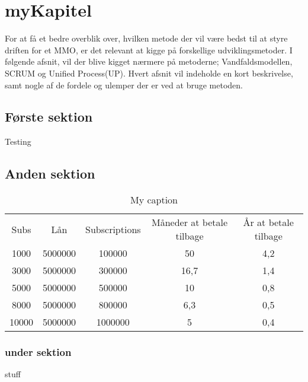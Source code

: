 \cfoot{\page\textbackslash \totalp} %
\chapter{myKapitel}
For at få et bedre overblik over, hvilken metode der vil være bedst til at styre driften for et MMO, er det relevant at kigge på forskellige udviklingsmetoder. I følgende afsnit, vil der blive kigget nærmere på metoderne; Vandfaldsmodellen, SCRUM og Unified Process(UP). Hvert afsnit vil indeholde en kort beskrivelse, samt nogle af de fordele og ulemper der er ved at bruge metoden.\\
\section{Første sektion}
Testing
\section{Anden sektion}
\begin{table}[]
\centering
\caption{My caption}
\label{my-label}
\begin{tabular}{|c|c|c|c|c|}
Subs  & Lån     & Subscriptions & Måneder at betale tilbage & År at betale tilbage \\
1000  & 5000000 & 100000        & 50                        & 4,2                  \\
3000  & 5000000 & 300000        & 16,7                      & 1,4                  \\
5000  & 5000000 & 500000        & 10                        & 0,8                  \\
8000  & 5000000 & 800000        & 6,3                       & 0,5                  \\
10000 & 5000000 & 1000000       & 5                         & 0,4                 
\end{tabular}
\end{table}

\subsection{under sektion}

\cite{HTL}stuff

